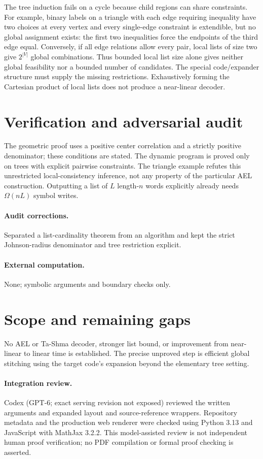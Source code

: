 \documentclass[11pt]{article}
\begin{document}
The tree induction fails on a cycle because child regions can share constraints. For example, binary labels on a triangle with each edge requiring inequality have two choices at every vertex and every single-edge constraint is extendible, but no global assignment exists: the first two inequalities force the endpoints of the third edge equal. Conversely, if all edge relations allow every pair, local lists of size two give $2^{|V|}$ global combinations. Thus bounded local list size alone gives neither global feasibility nor a bounded number of candidates. The special code/expander structure must supply the missing restrictions. Exhaustively forming the Cartesian product of local lists does not produce a near-linear decoder.
\section{Verification and adversarial audit}
The geometric proof uses a positive center correlation and a strictly positive denominator; these conditions are stated. The dynamic program is proved only on trees with explicit pairwise constraints. The triangle example refutes this unrestricted local-consistency inference, not any property of the particular AEL construction. Outputting a list of $L$ length-$n$ words explicitly already needs $\Omega(nL)$ symbol writes.
\paragraph{Audit corrections.} Separated a list-cardinality theorem from an algorithm and kept the strict Johnson-radius denominator and tree restriction explicit.
\paragraph{External computation.} None; symbolic arguments and boundary checks only.
\section{Scope and remaining gaps}
No AEL or Ta-Shma decoder, stronger list bound, or improvement from near-linear to linear time is established. The precise unproved step is efficient global stitching using the target code's expansion beyond the elementary tree setting.
\paragraph{Integration review.} Codex (GPT-6; exact serving revision not exposed) reviewed the written arguments and expanded layout and source-reference wrappers. Repository metadata and the production web renderer were checked using Python 3.13 and JavaScript with MathJax 3.2.2. This model-assisted review is not independent human proof verification; no PDF compilation or formal proof checking is asserted.
\end{document}
